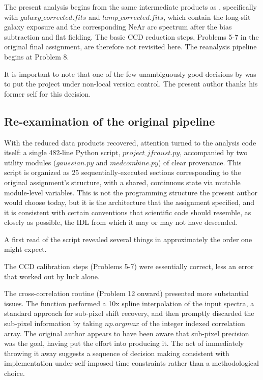 \documentclass{aa}
\begin{document}
    The present analysis begins from the same intermediate products as \cite{fraustro}, specifically with $galaxy\_corrected.fits$ and $lamp\_corrected.fits$, which contain the long-slit galaxy exposure and the corresponding NeAr arc spectrum after the bias subtraction and flat fielding. The basic CCD reduction steps, Problems 5-7 in the original final assignment, are therefore not revisited here. The reanalysis pipeline begins at Problem 8.

    It is important to note that one of the few unambiguously good decisions by \cite{fraustro} was to put the project under non-local version control. The present author thanks his former self for this decision.

    \subsection{Re-examination of the original pipeline}

    With the reduced data products recovered, attention turned to the analysis code itself: a single 482-line Python script, $project\_jfraust.py$, accompanied by two utility modules ($gaussian.py$ and $medcombine.py$) of clear provenance. This script is organized as 25 sequentially-executed sections corresponding to the original assignment's structure, with a shared, continuous state via mutable module-level variables. This is not the programming structure the present author would choose today, but it is the architecture that the assignment specified, and it is consistent with certain conventions that scientific code should resemble, as closely as possible, the IDL from which it may or may not have descended.

    A first read of the script revealed several things in approximately the order one might expect.

    The CCD calibration steps (Problems 5-7) were essentially correct, less an error that worked out by luck alone.

    The cross-correlation routine (Problem 12 onward) presented more substantial issues. The function performed a 10x spline interpolation of the input spectra, a standard approach for sub-pixel shift recovery, and then promptly discarded the sub-pixel information by taking $np.argmax$ of the integer indexed correlation array. The original author appears to have been aware that sub-pixel precision was the goal, having put the effort into producing it. The act of immediately throwing it away suggests a sequence of decision making consistent with implementation under self-imposed time constraints rather than a methodological choice.
\end{document}
